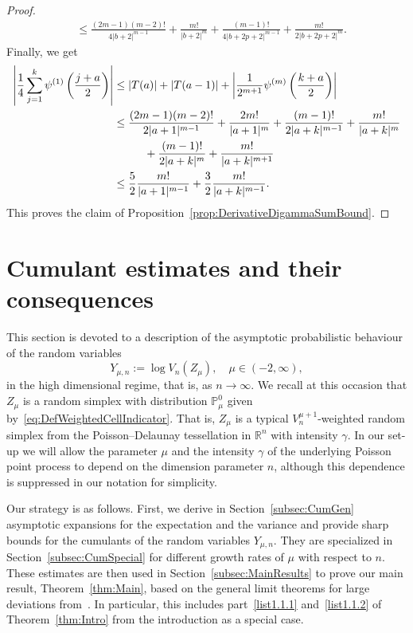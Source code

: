 \documentclass[AHL,Unicode,longabstracts,published]{cedram}
\newcommand{\R}{\mathbb{R}}
\newcommand{\PP}{\mathbb{P}}
\begin{document}
\begin{proof}
\begin{align*}
&\leq\frac{(2m-1)(m-2)!}{4|b+2|^{m-1}}+\frac{m!}{|b+2|^{m}}+\frac{(m-1)!}{4|b+2p+2|^{m-1}}+\frac{m!}{2|b+2p+2|^{m}}.
\end{align*}
Finally, we get
\begin{align*}
\left|\frac14\sum\limits_{j=1}^k\psi^{(1)}\left(\frac{j+a}{2}\right)\right|&\leq\left|T(a)\right|+\left|T(a-1)\right|+\left|\frac{1}{2^{m+1}}\psi^{(m)}\left(\frac{k+a}{2}\right)\right|\\
&\leq\frac{(2m-1)(m-2)!}{2|a+1|^{m-1}}+\frac{2m!}{|a+1|^{m}}+\frac{(m-1)!}{2|a+k|^{m-1}}+\frac{m!}{|a+k|^{m}}\\
&\mkern50mu +\frac{(m-1)!}{2|a+k|^{m}}+\frac{m!}{|a+k|^{m+1}}\\
&\leq \frac{5}{2} \frac{m!}{|a+1|^{m-1}}+\frac{3}{2}\frac{m!}{|a+k|^{m-1}}.
\end{align*}
This proves the claim of Proposition~\ref{prop:DerivativeDigammaSumBound}.
\end{proof}

\section{Cumulant estimates and their consequences}\label{sec:CumulantsResults}

This section is devoted to a description of the asymptotic probabilistic behaviour of the random variables
\begin{equation}\label{eq:DefYmun}
Y_{\mu,n}:=\log V_n(Z_{\mu}),\quad \mu\in(-2,\infty),
\end{equation}
in the high dimensional regime, that is, as $n\to\infty$. We recall at this occasion that $Z_\mu$ is a random simplex with distribution $\PP_\mu^0$ given by~\eqref{eq:DefWeightedCellIndicator}. That is, $Z_\mu$ is a typical $V_n^{\mu+1}$-weighted random simplex from the Poisson--Delaunay tessellation in $\R^n$ with intensity $\gamma$. In our set-up we will allow the parameter $\mu$ and the intensity $\gamma$ of the underlying Poisson point process to depend on the dimension parameter $n$, although this dependence is suppressed in our notation for simplicity.

Our strategy is as follows. First, we derive in Section~\ref{subsec:CumGen} asymptotic expansions for the expectation and the variance and provide sharp bounds for the cumulants of the random variables $Y_{\mu,n}$. They are specialized in Section~\ref{subsec:CumSpecial} for different growth rates of $\mu$ with respect to $n$. These estimates are then used in Section~\ref{subsec:MainResults} to prove our main result, Theorem~\ref{thm:Main}, based on the general limit theorems for large deviations from~\cite[Chapter~2]{SS91}. In particular, this includes part~\eqref{list1.1.1} and~\eqref{list1.1.2} of Theorem~\ref{thm:Intro} from the introduction as a special case.
\end{document}
